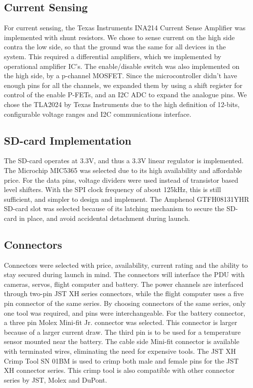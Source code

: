 \documentclass{article}
\begin{document}
\subsection{Current Sensing}
For current sensing, the Texas Instruments INA214 Current Sense Amplifier was implemented with shunt resistors. We chose to sense current on the high side contra the low side, so that the ground was the same for all devices in the system. This required a differential amplifiers, which we implemented by operational amplifier IC's. The enable/disable switch was also implemented on the high side, by a p-channel MOSFET. Since the microcontroller didn't have enough pins for all the channels, we expanded them by using a shift register for control of the enable P-FETs, and an I2C ADC to expand the analogue pins. We chose the TLA2024 by Texas Instruments due to the high definition of 12-bits, configurable voltage ranges and I2C communications interface. 

\subsection{SD-card Implementation}
The SD-card operates at 3.3V, and thus a 3.3V linear regulator is implemented. The Microchip MIC5365 was selected due to its high availability and affordable price. For the data pins, voltage dividers were used instead of transistor based level shifters. With the SPI clock frequency of about 125kHz, this is still sufficient, and simpler to design and implement. The Amphenol GTFH08131YHR SD-card slot was selected because of its latching mechanism to secure the SD-card in place, and avoid accidental detachment during launch.

\subsection{Connectors}
Connectors were selected with price, availability, current rating and the ability to stay secured during launch in mind. The connectors will interface the PDU with cameras, servos, flight computer and battery. The power channels are interfaced through two-pin JST XH series connectors, while the flight computer uses a five pin connector of the same series. By choosing connectors of the same series, only one tool was required, and pins were interchangeable. For the battery connector, a three pin Molex Mini-fit Jr. connector was selected. This connector is larger because of a larger current draw. The third pin is to be used for a temperature sensor mounted near the battery. The cable side Mini-fit connector is available with terminated wires, eliminating the need for expensive tools. The JST XH Crimp Tool SN 01BM is used to crimp both male and female pins for the JST XH connector series. This crimp tool is also compatible with other connector series by JST, Molex and DuPont.
\end{document}
